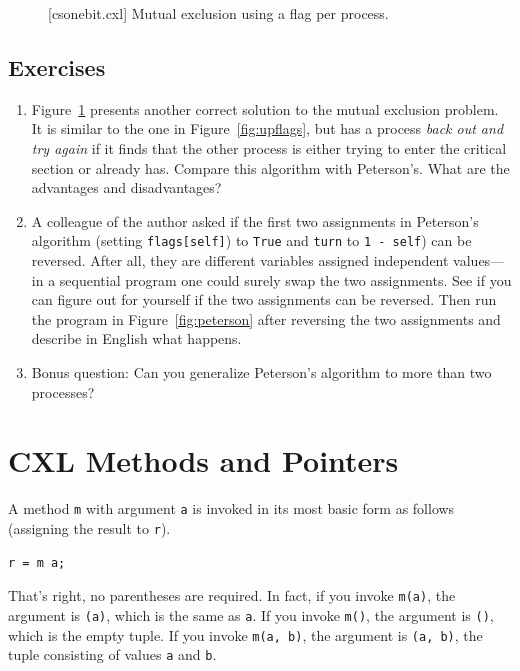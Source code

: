 \documentclass{report}
\newenvironment{code}{
\tcolorbox
}{
\endtcolorbox
}
\begin{document}
\begin{figure}
\begin{code}
\end{code}
\caption{[csonebit.cxl] Mutual exclusion using a flag per process.}
\label{fig:csonebit}
\end{figure}

\section*{Exercises}
\begin{enumerate}
\item Figure~\ref{fig:csonebit} presents another correct solution to the
mutual exclusion problem.  It is similar to the one in
Figure~\ref{fig:upflags}, but has a process \emph{back out and try again}
if it finds that the other process is either trying to enter the critical
section or already has.  Compare this algorithm with Peterson's.  What are
the advantages and disadvantages?
\item A colleague of the author asked if the first two assignments in
Peterson's algorithm (setting \texttt{flags[self]})
to \texttt{True} and \texttt{turn} to \texttt{1 - self}) can be reversed.
After all, they are different variables assigned independent values---in a
sequential program one could surely swap the two assignments.
See if you can figure out for yourself if the two assignments can be
reversed.  Then run the program in Figure~\ref{fig:peterson} after reversing
the two assignments and describe in English what happens.
\item Bonus question:
Can you generalize Peterson's algorithm to more than two processes?
\end{enumerate}

\chapter{CXL Methods and Pointers}
\label{ch:method}

A method \texttt{m} with argument \texttt{a} is invoked in its
most basic form as follows (assigning the result to \texttt{r}).
\begin{code}
\begin{verbatim}
r = m a;
\end{verbatim}
\end{code}
That's right, no parentheses are required.  In fact, if you invoke
\texttt{m(a)}, the argument is \texttt{(a)}, which is the same
as \texttt{a}.
If you invoke \texttt{m()}, the argument is \texttt{()},
which is the empty tuple.
If you invoke \texttt{m(a, b)}, the argument is \texttt{(a, b)},
the tuple consisting of values \texttt{a} and \texttt{b}.
\end{document}
